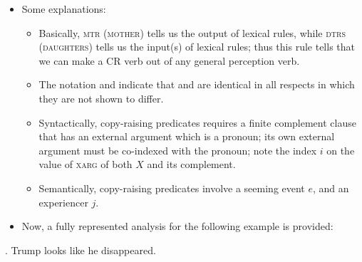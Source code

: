 \documentclass[11pt]{article}
\begin{document}
\begin{itemize}
  \item Some explanations:
    \begin{itemize}
      \item Basically, \textsc{mtr} (\textsc{mother}) tells us the output of lexical rules, while \textsc{dtrs} (\textsc{daughters}) tells us the input(s) of lexical rules; thus this rule tells that we can make a CR verb out of any general perception verb.
      \item  The notation  and  indicate that \avm{[A]} and \avm{[B]} are identical in all respects in which they are not shown to differ.
      \item  Syntactically, copy-raising predicates requires a finite complement clause that has an external argument which is a pronoun; its own external argument must be co-indexed with the pronoun; note the index \(i\) on the value of \textsc{xarg} of both \(X\) and its complement.
      \item Semantically, copy-raising predicates involve a seeming event \(e\), and an experiencer \(j\).
    \end{itemize}
  \item Now, a fully represented analysis for the following example is provided:
\end{itemize}
\ex. Trump looks like he disappeared.
\end{document}
